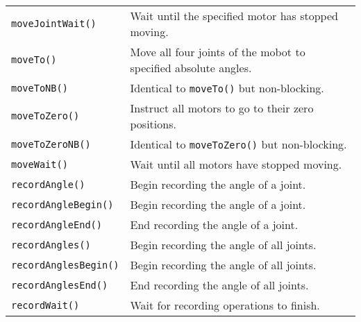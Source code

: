 \begin{table}[!h]
\begin{center}
\begin{tabular}{p{48 mm}p{110 mm}}
\texttt{moveJointWait()} & Wait until the specified motor has stopped moving. \\
\texttt{moveTo()} & Move all four joints of the mobot to specified absolute angles. \\
\texttt{moveToNB()} & Identical to \texttt{moveTo()} but non-blocking. \\
\texttt{moveToZero()} & Instruct all motors to go to their zero positions. \\
\texttt{moveToZeroNB()} & Identical to \texttt{moveToZero()} but non-blocking. \\
\texttt{moveWait()} & Wait until all motors have stopped moving. \\
\texttt{recordAngle()} & Begin recording the angle of a joint. \\
\texttt{recordAngleBegin()} & Begin recording the angle of a joint. \\
\texttt{recordAngleEnd()} & End recording the angle of a joint. \\
\texttt{recordAngles()} & Begin recording the angle of all joints. \\
\texttt{recordAnglesBegin()} & Begin recording the angle of all joints. \\
\texttt{recordAnglesEnd()} & End recording the angle of all joints. \\
\texttt{recordWait()} & Wait for recording operations to finish. \\
\hline
\end{tabular}
\end{center}
\label{mobilec_api_cbinary}
\end{table}

\addtocounter{table}{-1}


